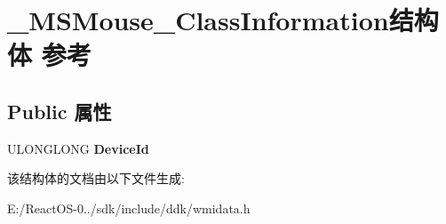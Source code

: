 \hypertarget{struct___m_s_mouse___class_information}{}\section{\+\_\+\+M\+S\+Mouse\+\_\+\+Class\+Information结构体 参考}
\label{struct___m_s_mouse___class_information}
\subsection*{Public 属性}
\begin{DoxyCompactItemize}
\item 
\mbox{\label{struct___m_s_mouse___class_information_a996befd3ed4c18ab2e8e9ff09b0b0afc}} 
U\+L\+O\+N\+G\+L\+O\+NG {\bfseries Device\+Id}
\end{DoxyCompactItemize}


该结构体的文档由以下文件生成\+:\begin{DoxyCompactItemize}
\item 
E\+:/\+React\+O\+S-\/0../sdk/include/ddk/wmidata.\+h\end{DoxyCompactItemize}
